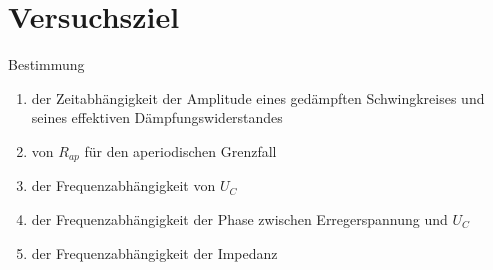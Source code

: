 \section{Versuchsziel}
\label{sec:Ziel}
Bestimmung

   \begin{enumerate}
     \item der Zeitabhängigkeit der Amplitude eines gedämpften Schwingkreises
     und seines effektiven Dämpfungswiderstandes
     \item von $R_{ap}$ für den aperiodischen Grenzfall
     \item der Frequenzabhängigkeit von $U_C$
     \item der Frequenzabhängigkeit der Phase \varphi zwischen Erregerspannung
     und $U_C$
     \item der Frequenzabhängigkeit der Impedanz
   \end{enumerate}
